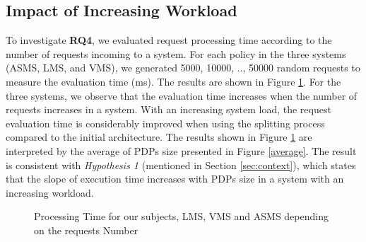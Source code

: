 \subsection{Impact of Increasing Workload}\label{subsec:Systemworkload}
To investigate \textbf{RQ4}, we evaluated request processing time according to the number of requests incoming to a system. 
For each policy in the three systems (ASMS, LMS, and VMS), we generated 5000, 10000, .., 50000 random requests to measure the evaluation time (ms).
The results are shown in Figure \ref{fig:processing time xengine}. For the three systems, we observe that the evaluation time increases when 
the number of requests increases in a system. With an increasing system load, the request evaluation time is considerably
 improved when using the splitting process compared to the initial architecture. 
The results shown in Figure \ref{fig:processing time xengine} are interpreted by the average of PDPs size presented in 
Figure \ref{average}. The result is consistent with \textit{Hypothesis 1} (mentioned in Section \ref{sec:context}), 
which states that the slope of execution time increases with PDPs size in a system with an increasing workload.
\begin{figure}
  \centering
  \caption{Processing Time for our subjects, LMS, VMS and ASMS depending on the requests Number}
  \label{fig:processing time xengine}
\end{figure}

